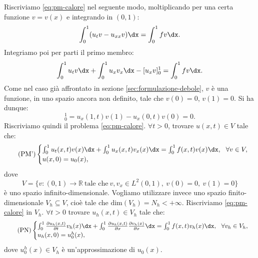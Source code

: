 Riscriviamo \eqref{eq:pm-calore} nel seguente modo, moltiplicando per una certa funzione $v=v(x)$ e integrando in $( 0,1)$:
\begin{equation*}
\int\nolimits ^{1}_{0}( u_{t} v-u_{xx} v) \dx=\int\nolimits ^{1}_{0} fv\dx.
\end{equation*}
Integriamo poi per parti il primo membro:
\begin{equation*}
\int\nolimits ^{1}_{0} u_{t} v\dx+\int\nolimits ^{1}_{0} u_{x} v_{x} \dx-[ u_{x} v]^{1}_{0} =\int\nolimits ^{1}_{0} fv\dx.
\end{equation*}
Come nel caso già affrontato in sezione \ref{sec:formulazione-debole}, $v$ è una funzione, in uno spazio ancora non definito, tale che $v(0) =0$, $v(1) =0$.
Si ha dunque:
\begin{equation*}
[ u_{x} v]^{1}_{0} =u_{x}( 1,t) v(1) -u_{x}( 0,t) v(0) =0.
\end{equation*}
Riscriviamo quindi il problema \eqref{eq:pm-calore}. $\forall t >0$,  trovare $u( x,t) \in V$ tale che:
\begin{equation*}\tag{PM'}\label{eq:pm1-calore}
\begin{cases}
\int\nolimits ^{1}_{0} u_{t}( x,t) v(x) \dx+\int\nolimits ^{1}_{0} u_{x}( x,t) v_{x}(x) \dx=\int\nolimits ^{1}_{0} f( x,t) v(x) \dx,\ \ \forall v\in V,\\
u( x,0) =u_{0}(x) ,
\end{cases}
\end{equation*}
dove
\begin{equation*}
V=\{
v:( 0,1)\rightarrow \mathbb{R} \ \text{tale che} \ v, v_{x} \in L^{2}( 0,1) ,\ v(0) =0,\ v(1) =0\}
\end{equation*}
è uno spazio infinito-dimensionale.
Vogliamo utilizzare invece uno spazio finito-dimensionale $V_{h} \subseteq V$, cioè tale che $\mathrm{dim}( V_{h}) =N_{h} < +\infty $.
Riscriviamo \eqref{eq:pm-calore} in $V_{h}$. $\forall t >0$ trovare $u_{h}( x,t) \in V_{h}$ tale che:
\begin{equation*}\tag{PN}\label{eq:pn-calore}
\begin{cases}
\int\nolimits ^{1}_{0}\frac{\partial u_{h}( x,t)}{\partial t} v_{h}(x) \dx+\int\nolimits ^{1}_{0}\frac{\partial u_{h}( x,t)}{\partial x}\frac{\partial v_{h}(x)}{\partial x} \dx=\int\nolimits ^{1}_{0} f( x,t) v_{h}(x) \dx,\ \ \forall v_{h} \in V_{h} ,\\
u_{h}( x,0) =u^{h}_{0}(x) ,
\end{cases}
\end{equation*}
dove $u^{h}_{0}(x) \in V_{h}$ è un'approssimazione di $u_{0}(x)$.

